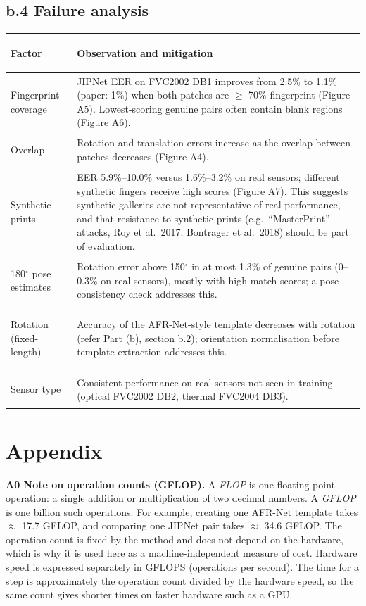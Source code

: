 \documentclass[10pt,a4paper]{article}
\begin{document}
\subsection*{b.4 \textperiodcentered{} Failure analysis}
\begin{tabularx}{\textwidth}{@{}>{\bfseries\raggedright}p{3.2cm}X@{}}\toprule
\textbf{Factor} & \textbf{Observation and mitigation}\\\midrule
Fingerprint coverage & JIPNet EER on FVC2002 DB1 improves from 2.5\% to 1.1\% (paper: 1\%) when both patches are $\geq$ 70\% fingerprint (Figure A5). Lowest-scoring genuine pairs often contain blank regions (Figure A6).\\\midrule
Overlap & Rotation and translation errors increase as the overlap between patches decreases (Figure A4).\\\midrule
Synthetic prints & EER 5.9\%--10.0\% versus 1.6\%--3.2\% on real sensors; different synthetic fingers receive high scores (Figure A7). This suggests synthetic galleries are not representative of real performance, and that resistance to synthetic prints (e.g.\ ``MasterPrint'' attacks, Roy et al.\ 2017; Bontrager et al.\ 2018) should be part of evaluation.\\\midrule
180$^\circ$ pose estimates & Rotation error above 150$^\circ$ in at most 1.3\% of genuine pairs (0--0.3\% on real sensors), mostly with high match scores; a pose consistency check addresses this.\\\midrule
Rotation (fixed-length) & Accuracy of the AFR-Net-style template decreases with rotation (refer Part (b), section b.2); orientation normalisation before template extraction addresses this.\\\midrule
Sensor type & Consistent performance on real sensors not seen in training (optical FVC2002 DB2, thermal FVC2004 DB3).\\\bottomrule
\end{tabularx}

\clearpage
\section*{Appendix}
\textbf{A0 \textperiodcentered{} Note on operation counts (GFLOP).} A \emph{FLOP} is one floating-point operation: a single addition or multiplication of two decimal numbers. A \emph{GFLOP} is one billion such operations. For example, creating one AFR-Net template takes $\approx$ 17.7 GFLOP, and comparing one JIPNet pair takes $\approx$ 34.6 GFLOP. The operation count is fixed by the method and does not depend on the hardware, which is why it is used here as a machine-independent measure of cost. Hardware speed is expressed separately in GFLOPS (operations per second). The time for a step is approximately the operation count divided by the hardware speed, so the same count gives shorter times on faster hardware such as a GPU.
\end{document}
